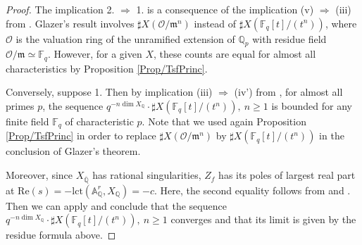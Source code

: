 \documentclass[11pt,english]{article}
\numberwithin{equation}{section}
\numberwithin{figure}{section}
\theoremstyle{definition}
\theoremstyle{plain}
\theoremstyle{remark}
\begin{document}
\begin{proof}

The implication 2. $\Rightarrow$ 1. is a consequence of the implication
(v) $\Rightarrow$ (iii) from \cite[Thm. 4.1.]{Gla19}. Glazer's result
involves $\sharp X(\mathcal{O}/\mathfrak{m}^{n})$ instead of $\sharp X(\mathbb{F}_{q}[t]/(t^{n}))$,
where $\mathcal{O}$ is the valuation ring of the unramified extension
of $\mathbb{Q}_{p}$ with residue field $\mathcal{O}/\mathfrak{m}\simeq\mathbb{F}_{q}$.
However, for a given $X$, these counts are equal for almost all characteristics
by Proposition \ref{Prop/TsfPrinc}.

Conversely, suppose 1. Then by implication (iii) $\Rightarrow$ (iv')
from \cite[Thm. 4.1.]{Gla19}, for almost all primes $p$, the sequence
$q^{-n\dim X_{\mathbb{Q}}}\cdot\sharp X(\mathbb{F}_{q}[t]/(t^{n})),\ n\geq1$
is bounded for any finite field $\mathbb{F}_{q}$ of characteristic
$p$. Note that we used again Proposition \ref{Prop/TsfPrinc} in
order to replace $\sharp X(\mathcal{O}/\mathfrak{m}^{n})$ by $\sharp X(\mathbb{F}_{q}[t]/(t^{n}))$
in the conclusion of Glazer's theorem.

Moreover, since $X_{\overline{\mathbb{Q}}}$ has rational singularities,
$Z_{f}$ has its poles of largest real part at $\text{Re}(s)=-\mathrm{lct}(\mathbb{A}_{\mathbb{Q}}^{r},X_{\mathbb{Q}})=-c$.
Here, the second equality follows from \cite[Prop. 1.4.]{Mus01} and
\cite[Cor. 0.2.]{Mus02}. Then we can apply \cite[Lem. 4.7.]{Wys17b}
and conclude that the sequence $q^{-n\dim X_{\mathbb{Q}}}\cdot\sharp X(\mathbb{F}_{q}[t]/(t^{n})),\ n\geq1$
converges and that its limit is given by the residue formula above.
\end{proof}
\end{document}
